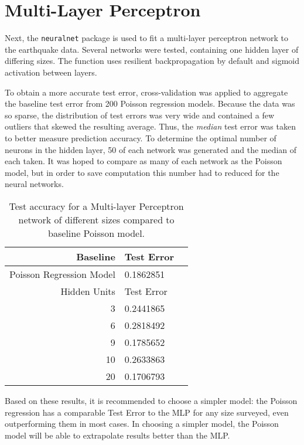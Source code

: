 
\section{Multi-Layer Perceptron}

Next, the \texttt{neuralnet} package \cite{neuralnet} is used to fit a multi-layer perceptron network to the earthquake data.  Several networks were tested, containing one hidden layer of differing sizes.  The function uses resilient backpropagation by default and sigmoid activation between layers.

To obtain a more accurate test error, cross-validation was applied to aggregate the baseline test error from 200 Poisson regression models. Because the data was so sparse, the distribution of test errors was very wide and contained a few outliers that skewed the resulting average.  Thus, the \textit{median} test error was taken to better measure prediction accuracy.
To determine the optimal number of neurons in the hidden layer, 50 of each network was generated and the median of each taken.  It was hoped to compare as many of each network as the Poisson model, but in order to save computation this number had to reduced for the neural networks.


\begin{table}[ht]
\centering
\begin{tabular}{rlr}
  \hline
 Baseline & Test Error \\ 
  \hline
  Poisson Regression Model & 0.1862851 \\ 
  \hline
 Hidden Units & Test Error \\ 
  \hline
3 & 0.2441865 \\ 
  6 & 0.2818492 \\ 
  9 & 0.1785652 \\ 
  10 & 0.2633863 \\ 
  20 & 0.1706793 \\ 
   \hline
\end{tabular}
   \caption{Test accuracy for a Multi-layer Perceptron network of different sizes compared to baseline Poisson model.}
\end{table}


Based on these results, it is recommended to choose a simpler model: the Poisson regression has a comparable Test Error to the MLP for any size surveyed, even outperforming them in most cases.  In choosing a simpler model, the Poisson model will be able to extrapolate results better than the MLP.


